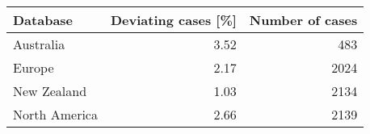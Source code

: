\begin{table}[ht]
      \centering
      \begin{tabular}{lrr}
        \hline
      Database & Deviating cases [\%] & Number of cases \\ 
        \hline
      Australia & 3.52 & 483 \\ 
        Europe & 2.17 & 2024 \\ 
        New Zealand & 1.03 & 2134 \\ 
        North America & 2.66 & 2139 \\ 
         \hline
\end{tabular}
\end{table}
